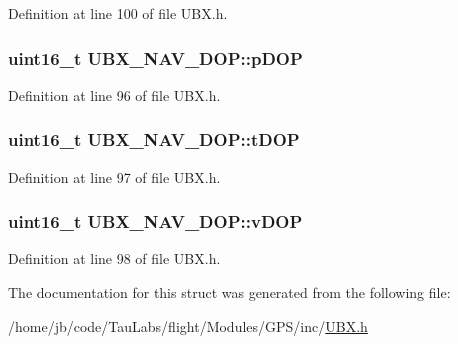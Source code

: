 \-Definition at line 100 of file \-U\-B\-X.\-h.

\hypertarget{struct_u_b_x___n_a_v___d_o_p_a1ad5dc519aeceb3054f3a4a0ab8fc5ea}{
\subsubsection[{p\-D\-O\-P}]{\setlength{\rightskip}{0pt plus 5cm}uint16\-\_\-t {\bf \-U\-B\-X\-\_\-\-N\-A\-V\-\_\-\-D\-O\-P\-::p\-D\-O\-P}}}\label{struct_u_b_x___n_a_v___d_o_p_a1ad5dc519aeceb3054f3a4a0ab8fc5ea}


\-Definition at line 96 of file \-U\-B\-X.\-h.

\hypertarget{struct_u_b_x___n_a_v___d_o_p_a12bd31e6a5d13f568b90a13f3888c694}{
\subsubsection[{t\-D\-O\-P}]{\setlength{\rightskip}{0pt plus 5cm}uint16\-\_\-t {\bf \-U\-B\-X\-\_\-\-N\-A\-V\-\_\-\-D\-O\-P\-::t\-D\-O\-P}}}\label{struct_u_b_x___n_a_v___d_o_p_a12bd31e6a5d13f568b90a13f3888c694}


\-Definition at line 97 of file \-U\-B\-X.\-h.

\hypertarget{struct_u_b_x___n_a_v___d_o_p_afb69d800723e5600027869cb709dd800}{
\subsubsection[{v\-D\-O\-P}]{\setlength{\rightskip}{0pt plus 5cm}uint16\-\_\-t {\bf \-U\-B\-X\-\_\-\-N\-A\-V\-\_\-\-D\-O\-P\-::v\-D\-O\-P}}}\label{struct_u_b_x___n_a_v___d_o_p_afb69d800723e5600027869cb709dd800}


\-Definition at line 98 of file \-U\-B\-X.\-h.



\-The documentation for this struct was generated from the following file\-:\begin{DoxyCompactItemize}
\item 
/home/jb/code/\-Tau\-Labs/flight/\-Modules/\-G\-P\-S/inc/\hyperlink{_u_b_x_8h}{\-U\-B\-X.\-h}\end{DoxyCompactItemize}
